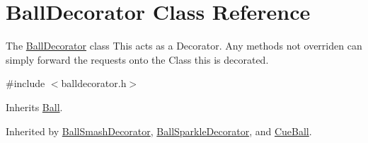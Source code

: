 \hypertarget{class_ball_decorator}{}\section{Ball\+Decorator Class Reference}
\label{class_ball_decorator}


The \mbox{\hyperlink{class_ball_decorator}{Ball\+Decorator}} class This acts as a Decorator. Any methods not overriden can simply forward the requests onto the Class this is decorated.  




{\ttfamily \#include $<$balldecorator.\+h$>$}



Inherits \mbox{\hyperlink{class_ball}{Ball}}.



Inherited by \mbox{\hyperlink{class_ball_smash_decorator}{Ball\+Smash\+Decorator}}, \mbox{\hyperlink{class_ball_sparkle_decorator}{Ball\+Sparkle\+Decorator}}, and \mbox{\hyperlink{class_cue_ball}{Cue\+Ball}}.

